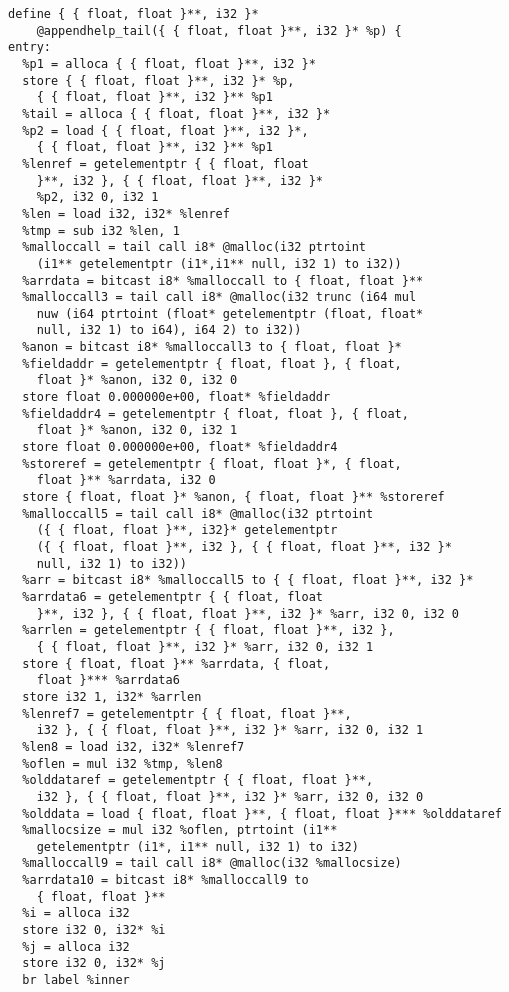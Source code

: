 \documentclass[main.tex]{subfiles}
\begin{document}
{\begin{lstlisting}
define { { float, float }**, i32 }* 
    @appendhelp_tail({ { float, float }**, i32 }* %p) {
entry:
  %p1 = alloca { { float, float }**, i32 }*
  store { { float, float }**, i32 }* %p,
    { { float, float }**, i32 }** %p1
  %tail = alloca { { float, float }**, i32 }*
  %p2 = load { { float, float }**, i32 }*,
    { { float, float }**, i32 }** %p1
  %lenref = getelementptr { { float, float 
    }**, i32 }, { { float, float }**, i32 }* 
    %p2, i32 0, i32 1
  %len = load i32, i32* %lenref
  %tmp = sub i32 %len, 1
  %malloccall = tail call i8* @malloc(i32 ptrtoint
    (i1** getelementptr (i1*,i1** null, i32 1) to i32))
  %arrdata = bitcast i8* %malloccall to { float, float }**
  %malloccall3 = tail call i8* @malloc(i32 trunc (i64 mul 
    nuw (i64 ptrtoint (float* getelementptr (float, float* 
    null, i32 1) to i64), i64 2) to i32))
  %anon = bitcast i8* %malloccall3 to { float, float }*
  %fieldaddr = getelementptr { float, float }, { float, 
    float }* %anon, i32 0, i32 0
  store float 0.000000e+00, float* %fieldaddr
  %fieldaddr4 = getelementptr { float, float }, { float,
    float }* %anon, i32 0, i32 1
  store float 0.000000e+00, float* %fieldaddr4
  %storeref = getelementptr { float, float }*, { float,
    float }** %arrdata, i32 0
  store { float, float }* %anon, { float, float }** %storeref
  %malloccall5 = tail call i8* @malloc(i32 ptrtoint
    ({ { float, float }**, i32}* getelementptr 
    ({ { float, float }**, i32 }, { { float, float }**, i32 }* 
    null, i32 1) to i32))
  %arr = bitcast i8* %malloccall5 to { { float, float }**, i32 }*
  %arrdata6 = getelementptr { { float, float
    }**, i32 }, { { float, float }**, i32 }* %arr, i32 0, i32 0
  %arrlen = getelementptr { { float, float }**, i32 },
    { { float, float }**, i32 }* %arr, i32 0, i32 1
  store { float, float }** %arrdata, { float,
    float }*** %arrdata6
  store i32 1, i32* %arrlen
  %lenref7 = getelementptr { { float, float }**,
    i32 }, { { float, float }**, i32 }* %arr, i32 0, i32 1
  %len8 = load i32, i32* %lenref7
  %oflen = mul i32 %tmp, %len8
  %olddataref = getelementptr { { float, float }**,
    i32 }, { { float, float }**, i32 }* %arr, i32 0, i32 0
  %olddata = load { float, float }**, { float, float }*** %olddataref
  %mallocsize = mul i32 %oflen, ptrtoint (i1** 
    getelementptr (i1*, i1** null, i32 1) to i32)
  %malloccall9 = tail call i8* @malloc(i32 %mallocsize)
  %arrdata10 = bitcast i8* %malloccall9 to 
    { float, float }**
  %i = alloca i32
  store i32 0, i32* %i
  %j = alloca i32
  store i32 0, i32* %j
  br label %inner


\end{lstlisting}}
\end{document}
